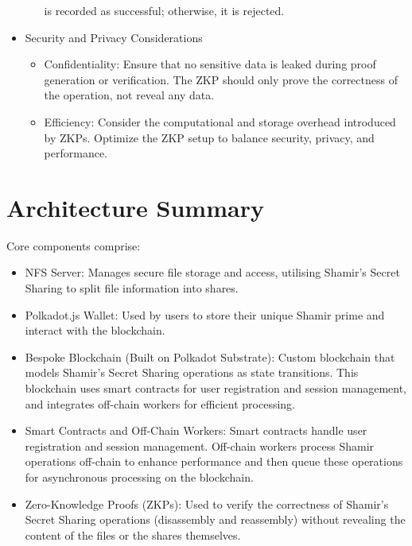 \documentclass{tufte-handout}
\begin{document}
\begin{itemize}
\begin{itemize}
is recorded as successful; otherwise, it is rejected.
\end{itemize}
\item Security and Privacy Considerations
\begin{itemize}
\item Confidentiality: Ensure that no sensitive data is leaked during proof generation or verification. The ZKP should only prove the correctness of the operation,
not reveal any data.
\item Efficiency: Consider the computational and storage overhead introduced by ZKPs. Optimize the ZKP setup to balance security, privacy, and performance.
\end{itemize}
\end{itemize}

\section{Architecture Summary}\label{sec:page-layout}
Core components comprise:
\begin{itemize}
\item NFS Server: Manages secure file storage and access, utilising Shamir's Secret Sharing to split file information into shares.
\item Polkadot.js Wallet: Used by users to store their unique Shamir prime and interact with the blockchain.
\item Bespoke Blockchain (Built on Polkadot Substrate): Custom blockchain that models Shamir's Secret Sharing operations as state transitions. This blockchain
uses smart contracts for user registration and session management, and integrates off-chain workers for efficient processing.
\item Smart Contracts and Off-Chain Workers: Smart contracts handle user registration and session management. Off-chain workers process Shamir operations off-chain to
enhance performance and then queue these operations for asynchronous processing on the blockchain.
\item Zero-Knowledge Proofs (ZKPs): Used to verify the correctness of Shamir's Secret Sharing operations (disassembly and reassembly) without revealing the content of
the files or the shares themselves.
\end{itemize}
\end{document}

